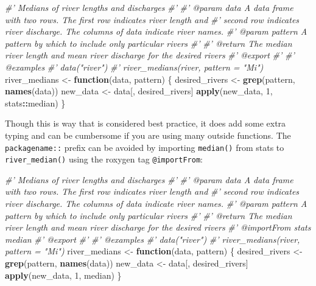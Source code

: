 \documentclass[
]{book}
\newenvironment{Shaded}{\begin{snugshade}}{\end{snugshade}}
\newcommand{\CommentTok}[1]{\textcolor[rgb]{0.56,0.35,0.01}{\textit{#1}}}
\newcommand{\ControlFlowTok}[1]{\textcolor[rgb]{0.13,0.29,0.53}{\textbf{#1}}}
\newcommand{\DecValTok}[1]{\textcolor[rgb]{0.00,0.00,0.81}{#1}}
\newcommand{\KeywordTok}[1]{\textcolor[rgb]{0.13,0.29,0.53}{\textbf{#1}}}
\newcommand{\NormalTok}[1]{#1}
\newcommand{\OperatorTok}[1]{\textcolor[rgb]{0.81,0.36,0.00}{\textbf{#1}}}
\newcommand{\StringTok}[1]{\textcolor[rgb]{0.31,0.60,0.02}{#1}}
\begin{document}
\begin{Shaded}
\begin{Highlighting}[]
\CommentTok{#' Medians of river lengths and discharges}
\CommentTok{#'}
\CommentTok{#' @param data A data frame with two rows. The first row indicates river length and}
\CommentTok{#'   second row indicates river discharge. The columns of data indicate river names.}
\CommentTok{#' @param pattern A pattern by which to include only particular rivers}
\CommentTok{#'}
\CommentTok{#' @return The median river length and mean river discharge for the desired rivers}
\CommentTok{#' @export}
\CommentTok{#'}
\CommentTok{#' @examples}
\CommentTok{#' data("river")}
\CommentTok{#' river_medians(river, pattern = "Mi")}
\NormalTok{river_medians <-}\StringTok{ }\ControlFlowTok{function}\NormalTok{(data, pattern) \{}
\NormalTok{  desired_rivers <-}\StringTok{ }\KeywordTok{grep}\NormalTok{(pattern, }\KeywordTok{names}\NormalTok{(data))}
\NormalTok{  new_data <-}\StringTok{ }\NormalTok{data[, desired_rivers]}
  \KeywordTok{apply}\NormalTok{(new_data, }\DecValTok{1}\NormalTok{, stats}\OperatorTok{::}\NormalTok{median)}
\NormalTok{\}}
\end{Highlighting}
\end{Shaded}

Though this is way that is considered best practice, it does add some extra typing and can be cumbersome if you are using many outside functions. The \texttt{packagename::} prefix can be avoided by importing \texttt{median()} from stats to \texttt{river\_median()} using the roxygen tag \texttt{@importFrom}:

\begin{Shaded}
\begin{Highlighting}[]
\CommentTok{#' Medians of river lengths and discharges}
\CommentTok{#'}
\CommentTok{#' @param data A data frame with two rows. The first row indicates river length and}
\CommentTok{#'   second row indicates river discharge. The columns of data indicate river names.}
\CommentTok{#' @param pattern A pattern by which to include only particular rivers}
\CommentTok{#'}
\CommentTok{#' @return The median river length and mean river discharge for the desired rivers}
\CommentTok{#' @importFrom stats median}
\CommentTok{#' @export}
\CommentTok{#'}
\CommentTok{#' @examples}
\CommentTok{#' data("river")}
\CommentTok{#' river_medians(river, pattern = "Mi")}
\NormalTok{river_medians <-}\StringTok{ }\ControlFlowTok{function}\NormalTok{(data, pattern) \{}
\NormalTok{  desired_rivers <-}\StringTok{ }\KeywordTok{grep}\NormalTok{(pattern, }\KeywordTok{names}\NormalTok{(data))}
\NormalTok{  new_data <-}\StringTok{ }\NormalTok{data[, desired_rivers]}
  \KeywordTok{apply}\NormalTok{(new_data, }\DecValTok{1}\NormalTok{, median)}
\NormalTok{\}}
\end{Highlighting}
\end{Shaded}
\end{document}
